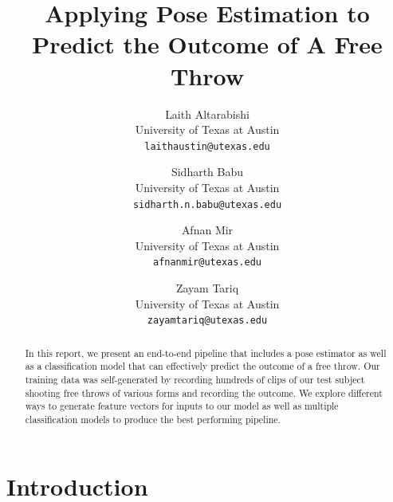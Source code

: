 \documentclass[10pt,twocolumn,letterpaper]{article}
\begin{document}
\title{Applying Pose Estimation to Predict the Outcome of A Free Throw}

\author{Laith Altarabishi\\
University of Texas at Austin\\
{\tt\small laithaustin@utexas.edu}
\and
Sidharth Babu\\
University of Texas at Austin\\
{\tt\small sidharth.n.babu@utexas.edu}
\and
Afnan Mir \\
University of Texas at Austin\\
{\tt\small afnanmir@utexas.edu}
\and
Zayam Tariq \\
University of Texas at Austin\\
{\tt\small zayamtariq@utexas.edu}
}
\maketitle

\begin{abstract}
  In this report, we present an end-to-end pipeline that includes a pose estimator as well as 
  a classification model that can effectively predict the outcome of a free throw. Our training data was
  self-generated by recording hundreds of clips of our test subject shooting free throws of various forms
  and recording the outcome. We explore different ways to generate feature vectors for inputs to our model as 
  well as multiple classification models to produce the best performing pipeline.
\end{abstract}


\section{Introduction}
\label{sec:intro}
\end{document}
